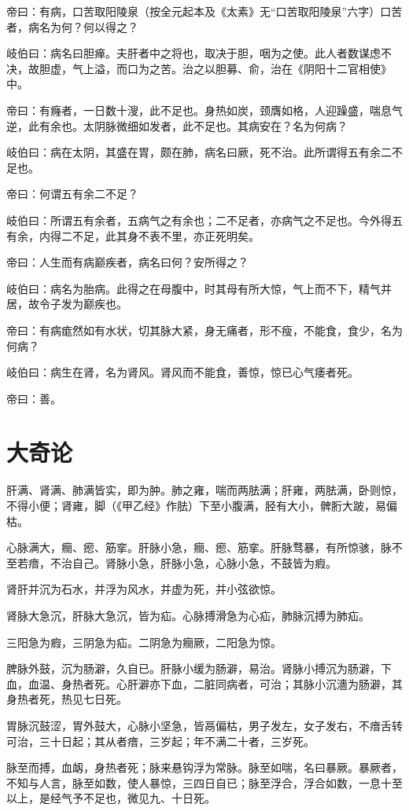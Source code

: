 \documentclass{article}%
\begin{document}
帝曰：有病，口苦取阳陵泉（按全元起本及《太素》无“口苦取阳陵泉”六字）口苦者，病名为何？何以得之？

岐伯曰：病名曰胆瘅。夫肝者中之将也，取决于胆，咽为之使。此人者数谋虑不决，故胆虚，气上溢，而口为之苦。治之以胆募、俞，治在《阴阳十二官相使》中。

帝曰：有癃者，一日数十溲，此不足也。身热如炭，颈膺如格，人迎躁盛，喘息气逆，此有余也。太阴脉微细如发者，此不足也。其病安在？名为何病？

岐伯曰：病在太阴，其盛在胃，颇在肺，病名曰厥，死不治。此所谓得五有余二不足也。

帝曰：何谓五有余二不足？

岐伯曰：所谓五有余者，五病气之有余也；二不足者，亦病气之不足也。今外得五有余，内得二不足，此其身不表不里，亦正死明矣。

帝曰：人生而有病巅疾者，病名曰何？安所得之？

岐伯曰：病名为胎病。此得之在母腹中，时其母有所大惊，气上而不下，精气并居，故令子发为巅疾也。

帝曰：有病痝然如有水状，切其脉大紧，身无痛者，形不瘦，不能食，食少，名为何病？

岐伯曰：病生在肾，名为肾风。肾风而不能食，善惊，惊已心气痿者死。

帝曰：善。
\section{大奇论}
肝满、肾满、肺满皆实，即为肿。肺之雍，喘而两胠满；肝雍，两胠满，卧则惊，不得小便；肾雍，脚（《甲乙经》作胠）下至小腹满，胫有大小，髀胻大跛，易偏枯。

心脉满大，癎、瘛、筋挛。肝脉小急，癎、瘛、筋挛。肝脉骛暴，有所惊骇，脉不至若瘖，不治自己。肾脉小急，肝脉小急，心脉小急，不鼓皆为瘕。

肾肝并沉为石水，并浮为风水，并虚为死，并小弦欲惊。

肾脉大急沉，肝脉大急沉，皆为疝。心脉搏滑急为心疝，肺脉沉搏为肺疝。

三阳急为瘕，三阴急为疝。二阴急为癎厥，二阳急为惊。

脾脉外鼓，沉为肠澼，久自已。肝脉小缓为肠澼，易治。肾脉小搏沉为肠澼，下血，血温、身热者死。心肝澼亦下血，二脏同病者，可治；其脉小沉濇为肠澼，其身热者死，热见七日死。

胃脉沉鼓涩，胃外鼓大，心脉小坚急，皆鬲偏枯，男子发左，女子发右，不瘖舌转可治，三十日起；其从者瘖，三岁起；年不满二十者，三岁死。

脉至而搏，血衂，身热者死；脉来悬钩浮为常脉。脉至如喘，名曰暴厥。暴厥者，不知与人言，脉至如数，使人暴惊，三四日自已；脉至浮合，浮合如数，一息十至以上，是经气予不足也，微见九、十日死。
\end{document}
